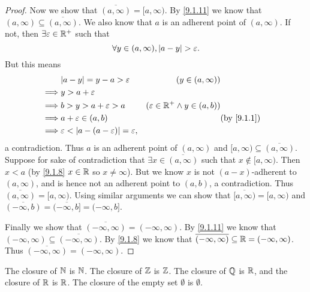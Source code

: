 \begin{proof}
	Now we show that \(\overline{(a, \infty)} = [a, \infty)\).
	By \cref{9.1.11} we know that \((a, \infty) \subseteq \overline{(a, \infty)}\).
	We also know that \(a\) is an adherent point of \((a, \infty)\).
	If not, then \(\exists \varepsilon \in \mathbb{R}^+\) such that
	\[
		\forall y \in (a, \infty), \left\lvert a - y\right\rvert > \varepsilon.
	\]
	But this means
	\begin{align}
		         & \abs{a - y} = y - a > \varepsilon                        & (y \in (a, \infty))                                    \\
		\implies & y > a + \varepsilon                                                                                               \\
		\implies & b > y > a + \varepsilon > a                              & (\varepsilon \in \R^+ \land y \in (a, b))              \\
		\implies & a + \varepsilon \in (a, b)                               &                                           & \by{9.1.1} \\
		\implies & \varepsilon < \abs{a - (a - \varepsilon)} = \varepsilon,
	\end{align}
	a contradiction.
	Thus \(a\) is an adherent point of \((a, \infty)\) and \([a, \infty) \subseteq \overline{(a, \infty)}\).
	Suppose for sake of contradiction that \(\exists x \in \overline{(a, \infty)}\) such that \(x \notin [a, \infty)\).
	Then \(x < a\) (by \cref{9.1.8} \(x \in \mathbb{R}\) so \(x \neq \infty\)).
	But we know \(x\) is not \((a - x)\)-adherent to \((a, \infty)\), and is hence not an adherent point to \((a, b)\), a contradiction.
	Thus \(\overline{(a, \infty)} = [a, \infty)\).
	Using similar arguments we can show that \(\overline{[a, \infty)} = [a, \infty)\) and \(\overline{(-\infty, b)} = \overline{(-\infty, b]} = (-\infty, b]\).

	Finally we show that \(\overline{(-\infty, \infty)} = (-\infty, \infty)\).
	By \cref{9.1.11} we know that \((-\infty, \infty) \subseteq \overline{(-\infty, \infty)}\).
	By \cref{9.1.8} we know that \(\overline{(-\infty, \infty)} \subseteq \mathbb{R} = (-\infty, \infty)\).
	Thus \(\overline{(-\infty, \infty)} = (-\infty, \infty)\).
\end{proof}

\begin{lem}\label{9.1.13}
	The closure of \(\mathbb{N}\) is \(\mathbb{N}\).
	The closure of \(\mathbb{Z}\) is \(\mathbb{Z}\).
	The closure of \(\mathbb{Q}\) is \(\mathbb{R}\), and the closure of \(\mathbb{R}\) is \(\mathbb{R}\).
	The closure of the empty set \(\emptyset\) is \(\emptyset\).
\end{lem}

